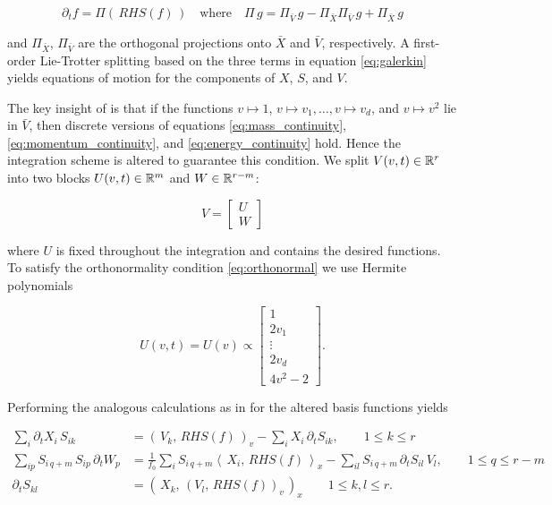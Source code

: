 \begin{equation}\label{eq:galerkin}
    \partial_t f = \Pi \left(\, RHS (f) \,\right) 
    \quad \text{where} \quad 
    \Pi\, g = \Pi_{\bar{V}}\, g - \Pi_{\bar{X}}\Pi_{\bar{V}}\, g + \Pi_{\bar{X}}\, g
\end{equation}

and $\Pi_{\bar{X}}$, $\Pi_{\bar{V}}$ are the orthogonal projections onto $\bar{X}$ and 
$\bar{V}$, respectively. A first-order Lie-Trotter splitting based on the three terms in 
equation \ref{eq:galerkin} yields equations of motion for the components of $X$, $S$, 
and $V$. 

The key insight of \cite{einkemmer2021}
is that if the functions $v \mapsto 1$, $v \mapsto v_1, \ldots, v \mapsto v_d$, and 
$v \mapsto v^2$ lie in $\bar{V}$, then discrete versions of equations 
\ref{eq:mass_continuity}, \ref{eq:momentum_continuity}, and \ref{eq:energy_continuity} 
hold. Hence the integration scheme is altered to guarantee this condition. We split 
$V (v, t) \in \mathbb{R}^r$ into two blocks $U(v, t) \in \mathbb{R}^m$ and $W \in \mathbb{R}^{r-m}$: 

\begin{equation}
    V = \begin{bmatrix}
        U \\
        W
    \end{bmatrix}
\end{equation}

where $U$ is fixed throughout the integration and contains the desired functions. To 
satisfy the orthonormality condition \ref{eq:orthonormal} we use Hermite polynomials

\begin{equation}
    U(v, t) = U(v) \propto \begin{bmatrix}
        1 \\
        2v_1 \\
        \vdots \\
        2v_d \\
        4v^2 - 2
    \end{bmatrix} . 
\end{equation}

Performing the analogous calculations as in \cite{einkemmer2018}
for the altered basis functions yields \cite{einkemmer2021}

\begin{align}
    \sum_i \partial_t X_i\, S_{i k} &= 
        (\,V_k,\, RHS(f)\,)_v - \sum_i X_i\, \partial_t S_{i k} ,
        \quad\quad 1 \leq k \leq r \label{eq:X_galerkin}\\
    \sum_{i p} S_{i\, q+m}\, S_{i p}\, \partial_t W_p &= 
        \frac{1}{f_0} \sum_i S_{i\, q+m} \left\langle\, X_i,\, RHS(f) \,\right\rangle_x 
        - \sum_{i l} S_{i\, q+m}\, \partial_t S_{i l}\, V_l ,
        \quad\quad 1 \leq q \leq r - m \label{eq:V_galerkin}\\
    \partial_t S_{k l} &= \left( \,X_k,\, ( V_l,\, RHS(f) )_v\, \right)_x 
        \quad\quad 1 \leq k, l \leq r . \label{eq:S_galerkin}
\end{align}

